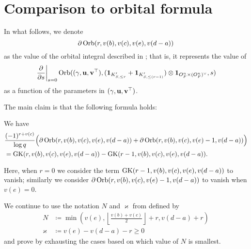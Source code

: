 \section{Comparison to orbital formula}
In what follows, we denote
\[ \partial\operatorname{Orb}(r, v(b), v(c), v(e), v(d-a)) \]
as the value of the orbital integral described in ; that is,
it represents the value of
\[ \left. \pdv{}{s} \right\rvert_{s=0}
  \operatorname{Orb}({(\gamma, \mathbf u, \mathbf v^\top)}, (\mathbf{1}_{K'_{S, \le r}} + \mathbf{1}_{K'_{S, \le (r-1)}}) \otimes \mathbf{1}_{O_F^n \times (O_F^n)^\vee}, s) \]
as a function of the parameters in ${(\gamma, \mathbf u, \mathbf v^\top)}$.

The main claim is that the following formula holds:
\begin{proposition}
  \label{prop:finale_by_one}
  We have
  \begin{align*}
    &\frac{(-1)^{r+v(c)}}{\log q}\Big(\partial\operatorname{Orb}(r, v(b), v(c), v(e), v(d-a))
      + \partial\operatorname{Orb}(r, v(b), v(c), v(e)-1, v(d-a))\Big) \\
    &= \operatorname{GK}(r, v(b), v(c), v(e), v(d-a)) - \operatorname{GK}(r-1, v(b), v(c), v(e), v(d-a)).
  \end{align*}
\end{proposition}
Here, when $r=0$ we consider the term
$\operatorname{GK}(r-1, v(b), v(c), v(e), v(d-a))$ to vanish;
similarly we consider
$\partial\operatorname{Orb}(r, v(b), v(c), v(e)-1, v(d-a))$ to vanish when $v(e)=0$.

We continue to use the notation $N$ and $\varkappa$ from  defined by
\begin{align*}
  N &\coloneqq \min \left( v(e),
    \left\lfloor \tfrac{v(b)+v(c)}{2} \right\rfloor + r, v(d-a) + r \right) \\
  \varkappa &\coloneqq v(e) - v(d-a) - r \ge 0
\end{align*}
and prove  by exhausting the
cases based on which value of $N$ is smallest.

